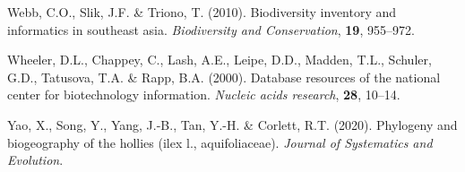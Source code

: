 \documentclass[]{article}
\begin{document}
\leavevmode\hypertarget{ref-webb2010biodiversity}{}%
Webb, C.O., Slik, J.F. \& Triono, T. (2010). Biodiversity inventory and informatics in southeast asia. \emph{Biodiversity and Conservation}, \textbf{19}, 955--972.

\leavevmode\hypertarget{ref-wheeler2000database}{}%
Wheeler, D.L., Chappey, C., Lash, A.E., Leipe, D.D., Madden, T.L., Schuler, G.D., Tatusova, T.A. \& Rapp, B.A. (2000). Database resources of the national center for biotechnology information. \emph{Nucleic acids research}, \textbf{28}, 10--14.

\leavevmode\hypertarget{ref-yao2020phylogeny}{}%
Yao, X., Song, Y., Yang, J.-B., Tan, Y.-H. \& Corlett, R.T. (2020). Phylogeny and biogeography of the hollies (ilex l., aquifoliaceae). \emph{Journal of Systematics and Evolution}.
\end{document}
